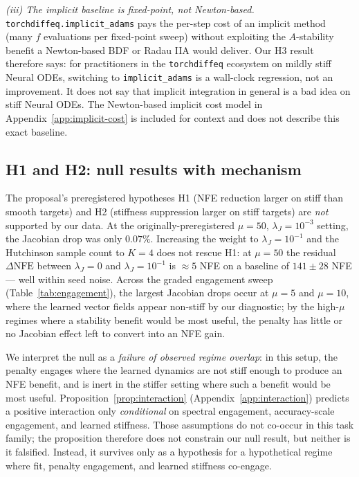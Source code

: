 \documentclass[11pt]{article}
\theoremstyle{plain}
\theoremstyle{definition}
\newcommand{\NFE}{\mathrm{NFE}}
\begin{document}
\emph{(iii) The implicit baseline is fixed-point, not Newton-based.}
\texttt{torchdiffeq.implicit\_adams} pays the per-step cost of an implicit
method (many $f$ evaluations per fixed-point sweep) without exploiting the
$A$-stability benefit a Newton-based BDF or Radau IIA would deliver. Our
H3 result therefore says: for practitioners in the \texttt{torchdiffeq}
ecosystem on mildly stiff Neural ODEs, switching to \texttt{implicit\_adams}
is a wall-clock regression, not an improvement. It does not say that
implicit integration in general is a bad idea on stiff Neural ODEs. The
Newton-based implicit cost model in Appendix~\ref{app:implicit-cost} is
included for context and does not describe this exact baseline.

\subsection{H1 and H2: null results with mechanism}
\label{sec:null}

The proposal's preregistered hypotheses H1 (NFE reduction larger on stiff
than smooth targets) and H2 (stiffness suppression larger on stiff targets)
are \emph{not} supported by our data. At the originally-preregistered
$\mu = 50$, $\lambda_J = 10^{-3}$ setting, the Jacobian drop was only
$0.07\%$. Increasing the weight to $\lambda_J = 10^{-1}$ and the Hutchinson
sample count to $K = 4$ does not rescue H1: at $\mu = 50$ the residual
$\Delta\NFE$ between $\lambda_J = 0$ and $\lambda_J = 10^{-1}$ is
$\approx 5$ NFE on a baseline of $141 \pm 28$ NFE --- well within seed noise.
Across the graded engagement sweep (Table~\ref{tab:engagement}), the largest
Jacobian drops occur at $\mu = 5$ and $\mu = 10$, where the learned vector
fields appear non-stiff by our diagnostic; by the high-$\mu$ regimes where a
stability benefit would be most useful, the penalty has little or no
Jacobian effect left to convert into an NFE gain.

We interpret the null as a \emph{failure of observed regime overlap}: in this
setup, the penalty engages where the learned dynamics are not stiff enough to
produce an NFE benefit, and is inert in the stiffer setting where such a
benefit would be most useful.
Proposition~\ref{prop:interaction} (Appendix~\ref{app:interaction}) predicts
a positive interaction only \emph{conditional} on spectral engagement,
accuracy-scale engagement, and learned stiffness. Those assumptions do not
co-occur in this task family; the proposition therefore does not constrain our
null result, but neither is it falsified. Instead, it survives only as a hypothesis
for a hypothetical regime where fit, penalty engagement, and learned stiffness
co-engage.
\end{document}
